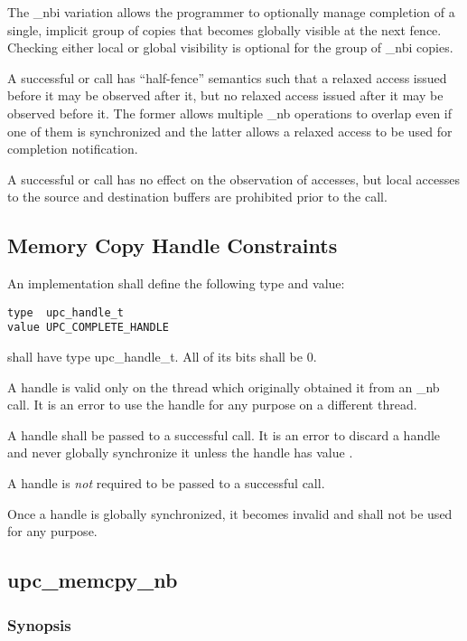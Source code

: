 \np The \_nbi variation allows the programmer to optionally manage completion of
a single, implicit group of copies that becomes globally visible at the next
fence.  Checking either local or global visibility is optional for the group of
\_nbi copies.

\np A successful \gsync{} or \gsynci{} call has ``half-fence'' semantics such
that a relaxed access issued before it may be observed after it, but no relaxed
access issued after it may be observed before it.  The former allows multiple
\_nb operations to overlap even if one of them is synchronized and the latter
allows a relaxed access to be used for completion notification.

\np A successful \lsync{} or \lsynci{} call has no effect on the observation of
accesses, but local accesses to the source and destination buffers are
prohibited prior to the call.

\subsection{Memory Copy Handle Constraints}
\setcounter{secnumdepth}{4}

\npf An implementation shall define the following type and value:

\begin{verbatim}
type  upc_handle_t
value UPC_COMPLETE_HANDLE
\end{verbatim}

\np \complete{} shall have type upc\_handle\_t.  All of its bits shall be 0.

\np A handle is valid only on the thread which originally obtained it from an
\_nb call.  It is an error to use the handle for any purpose on a different
thread.

\np A handle shall be passed to a successful \gsync{} call.  It is an error to
discard a handle and never globally synchronize it unless the handle has value
\complete{}. 

\np A handle is {\em not} required to be passed to a successful \lsync{} call.

\np Once a handle is globally synchronized, it becomes invalid and shall not be
used for any purpose.

\newpage
\subsection{upc\_memcpy\_nb}
\def\function{{\tt upc\_memcpy\_nb}}

\subsubsection{Synopsis}


